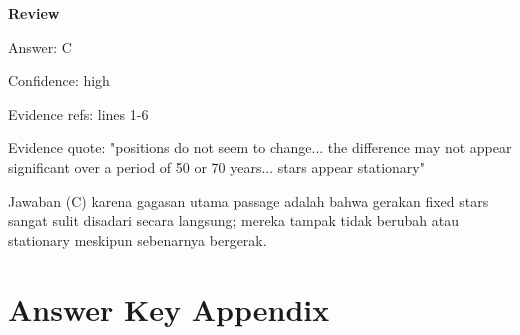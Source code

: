 \documentclass[12pt]{article}
\begin{document}
\par
\begingroup
\setlength{\parskip}{0pt}
\setlength{\parindent}{0pt}
\textbf{Review}\par
Answer: C\par
Confidence: high\par
Evidence refs: lines 1-6\par
Evidence quote: "positions do not seem to change... the difference may not appear significant over a period of 50 or 70 years... stars appear stationary"\par
Jawaban (C) karena gagasan utama passage adalah bahwa gerakan fixed stars sangat sulit disadari secara langsung; mereka tampak tidak berubah atau stationary meskipun sebenarnya bergerak.\par
\endgroup
\par
\vspace{0.25\baselineskip}
\newpage
\section*{Answer Key Appendix}
\end{document}

